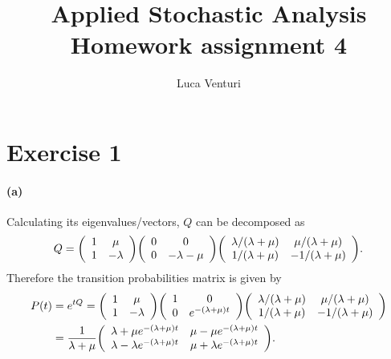 \documentclass[a4paper,11pt]{article}
\theoremstyle{definition}
\theoremstyle{plain}
\theoremstyle{remark}
\DeclarePairedDelimiter{\parr}{(}{)}
\begin{document}
\title{Applied Stochastic Analysis \\ Homework assignment 4}
\author{Luca Venturi}
\maketitle

\section*{Exercise 1}

\paragraph*{(a)} Calculating its eigenvalues/vectors, $Q$ can be decomposed as 
$$
Q = \parr*{\begin{array}{cc}
1 & \mu \\ 1 & -\lambda
\end{array}}\parr*{\begin{array}{cc}
0 & 0 \\ 0 & -\lambda-\mu
\end{array}}\parr*{\begin{array}{cc}
\lambda/(\lambda+\mu) & \mu/(\lambda+\mu) \\ 1/(\lambda+\mu) & -1/(\lambda+\mu)
\end{array}}.
$$
Therefore the transition probabilities matrix is given by
\begin{align*}
P(t) & = e^{tQ} = \parr*{\begin{array}{cc}
1 & \mu \\ 1 & -\lambda
\end{array}}\parr*{\begin{array}{cc}
1 & 0 \\ 0 & e^{-(\lambda+\mu)t}
\end{array}}\parr*{\begin{array}{cc}
\lambda/(\lambda+\mu) & \mu/(\lambda+\mu) \\ 1/(\lambda+\mu) & -1/(\lambda+\mu)
\end{array}} \\ & = \frac{1}{\lambda+\mu}\parr*{\begin{array}{cc}
\lambda + \mu e^{-(\lambda+\mu)t} & \mu-\mu e^{-(\lambda+\mu)t} \\
\lambda-\lambda e^{-(\lambda+\mu)t} & \mu+\lambda e^{-(\lambda+\mu)t}
\end{array}}.
\end{align*}
\end{document}
